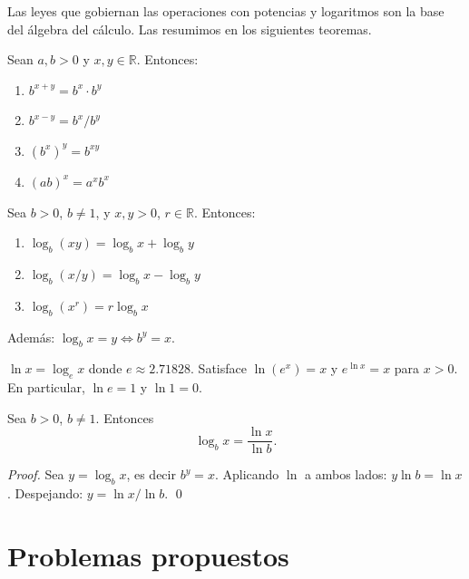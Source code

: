 Las leyes que gobiernan las operaciones con potencias y logaritmos son la base del álgebra del cálculo. Las resumimos en los siguientes teoremas.

\begin{theorem}
Sean $a, b > 0$ y $x, y \in \mathbb{R}$. Entonces:
\begin{enumerate}
  \item $b^{x+y} = b^x \cdot b^y$
  \item $b^{x-y} = b^x / b^y$
  \item $(b^x)^y = b^{xy}$
  \item $(ab)^x = a^x b^x$
\end{enumerate}
\end{theorem}

\begin{theorem}
Sea $b > 0$, $b \neq 1$, y $x, y > 0$, $r \in \mathbb{R}$. Entonces:
\begin{enumerate}
  \item $\log_b(xy) = \log_b x + \log_b y$
  \item $\log_b(x/y) = \log_b x - \log_b y$
  \item $\log_b(x^r) = r\log_b x$
\end{enumerate}
Además: $\log_b x = y \Leftrightarrow b^y = x$.
\end{theorem}

\begin{definition}
$\ln x = \log_e x$ donde $e \approx 2.71828$. Satisface $\ln(e^x) = x$ y $e^{\ln x} = x$ para $x > 0$. En particular, $\ln e = 1$ y $\ln 1 = 0$.
\end{definition}

\begin{theorem}
Sea $b > 0$, $b \neq 1$. Entonces
\[
  \log_b x = \frac{\ln x}{\ln b}.
\]
\end{theorem}
\begin{proof}
Sea $y = \log_b x$, es decir $b^y = x$. Aplicando $\ln$ a ambos lados: $y \ln b = \ln x$. Despejando: $y = \ln x / \ln b$. \qed
\end{proof}




\section{Problemas propuestos}

